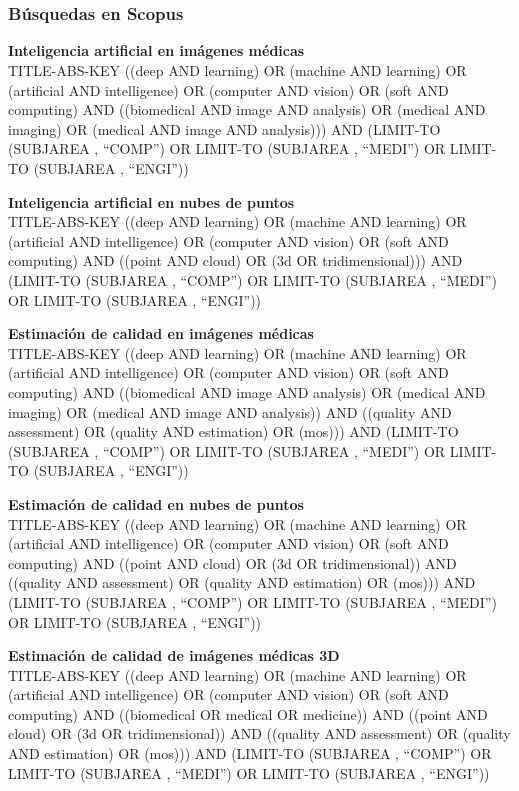 \chapter*{}
\subsection*{Búsquedas en Scopus}
\label{subs:Scopus}
\begin{enumerate}
\item 
{\footnotesize
  \textbf{Inteligencia artificial en imágenes médicas}\\\hfill
 TITLE-ABS-KEY ((deep AND learning) OR (machine AND learning) 
 OR (artificial AND intelligence) OR (computer AND vision) 
 OR (soft AND computing) AND ((biomedical AND image AND analysis) 
 OR (medical AND imaging) OR (medical AND image AND analysis))) 
 AND (LIMIT-TO (SUBJAREA , ``COMP'') OR LIMIT-TO (SUBJAREA , ``MEDI'') 
OR LIMIT-TO (SUBJAREA , ``ENGI''))
}
{\footnotesize
 \item \textbf{Inteligencia artificial en nubes de puntos}\\\hfill
 TITLE-ABS-KEY ((deep AND learning) OR (machine AND learning) OR (artificial AND intelligence) OR (computer AND vision) OR (soft AND computing) AND ((point AND cloud) OR (3d OR tridimensional))) AND (LIMIT-TO (SUBJAREA , ``COMP'') OR LIMIT-TO (SUBJAREA , ``MEDI'') OR LIMIT-TO (SUBJAREA , ``ENGI''))
}
{\footnotesize
 \item \textbf{Estimación de calidad en imágenes médicas}\\\hfill
 TITLE-ABS-KEY ((deep AND learning) OR (machine AND learning) OR (artificial AND intelligence) OR (computer AND vision) OR (soft AND computing) AND ((biomedical AND image AND analysis) OR (medical AND imaging) OR (medical AND image AND analysis)) AND ((quality AND assessment) OR (quality AND estimation) OR (mos))) AND (LIMIT-TO (SUBJAREA , ``COMP'') OR LIMIT-TO (SUBJAREA , ``MEDI'') OR LIMIT-TO (SUBJAREA , ``ENGI'')) 
}
{\footnotesize
 \item \textbf{Estimación de calidad en nubes de puntos}\\\hfill
 TITLE-ABS-KEY ((deep AND learning) OR (machine AND learning) OR (artificial AND intelligence) OR (computer AND vision) OR (soft AND computing) AND ((point AND cloud) OR (3d OR tridimensional)) AND ((quality AND assessment) OR (quality AND estimation) OR (mos))) AND (LIMIT-TO (SUBJAREA , ``COMP'') OR LIMIT-TO (SUBJAREA , ``MEDI'') OR LIMIT-TO (SUBJAREA , ``ENGI''))
}
{\footnotesize
 \item \textbf{Estimación de calidad de imágenes médicas 3D}\\\hfill
 TITLE-ABS-KEY ((deep AND learning) OR (machine AND learning) OR (artificial AND intelligence) OR (computer AND vision) OR (soft AND computing) AND ((biomedical OR medical OR medicine)) AND ((point AND cloud) OR (3d OR tridimensional)) AND ((quality AND assessment) OR (quality AND estimation) OR (mos))) AND (LIMIT-TO (SUBJAREA , ``COMP'') OR LIMIT-TO (SUBJAREA , ``MEDI'') OR LIMIT-TO (SUBJAREA , ``ENGI''))
}
\end{enumerate}
